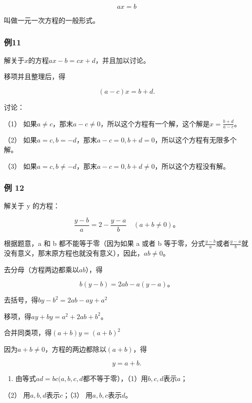 \[
a x = b
\]

叫做一元一次方程的一般形式。

\subsubsection{例11}

解关于\(x\)的方程\(ax - b = cx + d\)，并且加以讨论。

 移项并且整理后，得

\[
(a - c) x = b + d.
\]

讨论：

（1）
如果\(a \neq c\)，那末\(a - c \neq 0\)，所以这个方程有一个解，这个解是\(x = \frac{b + d}{a - c}\)。

（2）
如果\(a = c, b = -d\)，那末\(a - c = 0, b + d = 0\)，所以这个方程有无限多个解。

（3）
如果\(a = c, b \neq -d\)，那末\(a - c = 0, b + d \neq 0\)，所以这个方程没有解。

\subsubsection{例 12}

解关于 y 的方程：

\[
\frac{y - b}{a} = 2 - \frac{y - a}{b} \quad (a + b \neq 0)\text{。}
\]

 根据题意，a 和 b 都不能等于零（因为如果 a 或者 b
等于零，分式\(\frac{y-b}{a}\)或者\(\frac{y-a}{b}\)就没有意义，那末原方程也就没有意义），因此，\(ab \neq 0\)。

 去分母（方程两边都乘以\(ab\)），得

\[
b (y - b) = 2 a b - a (y - a)\text{。}
\]

去括号，得\(by - b^2 = 2ab - ay + a^2\)

移项，得\(ay + by = a^2 + 2ab + b^2\)。

合并同类项，得\((a + b)y = (a + b)^2\)

因为\(a + b \neq 0\)，方程的两边都除以\((a + b)\)，得

\[
y = a + b.
\]

\begin{enumerate}
\item
  由等式\(ad = bc(a, b, c, d\)都不等于零），（1）用\(b, c, d\)表示\(a\)；
\end{enumerate}

（2） 用\(a, b, d\)表示\(c\)；（3） 用\(a, b, c\)表示\(d\)。

